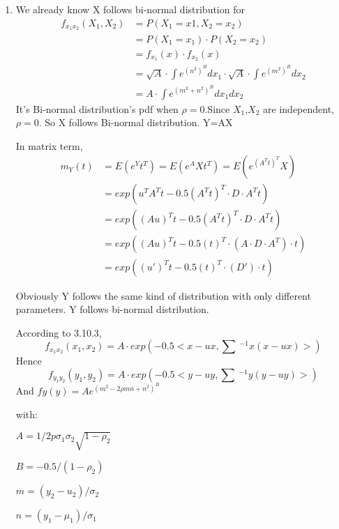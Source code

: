 \documentclass[12pt,a4paper]{article}
\makeatletter
\theoremstyle{definition}
\newtheorem*{solution}{Solution}
\renewenvironment{solution}[1][Solution] {\par\pushQED{\qed}\normalfont\topsep6\p@\@plus6\p@\relax\trivlist\item[\hskip\labelsep\bfseries#1\@addpunct{.}]\ignorespaces}{\popQED\endtrivlist\@endpefalse} \makeatother
\makeatother
\begin{document}
\begin{enumerate}[label=\roman*)]
\begin{solution}
        We already know X follows bi-normal distribution for 
        \begin{equation*}
            \begin{split}
                f_{x_1x_2}(X_1,X_2)&=P(X_1=x1,X_2=x_2)\\
                &=P(X_1=x_1)\cdot P(X_2=x_2)\\
                &=f_{x_1}(x)\cdot f_{x_2}(x)\\
                &=\sqrt{A}\cdot \int e^{(n^2)^B}dx_1\cdot \sqrt{A}\cdot \int e^{(m^2)^B}dx_2\\
                &=A\cdot \int e^{(m^2+n^2)^B} dx_1 dx_2
            \end{split}
        \end{equation*}
        It’s Bi-normal distribution’s pdf when $\rho=0$.Since $X_1$,$X_2$ are independent, $\rho=0$. So X follows Bi-normal distribution. Y=AX
        
        In matrix term,
        \begin{equation*}
            \begin{split}
                m_Y(t)&=E(e^Yt^T)=E(e^AXt^T)=E(e^{(A^Tt)^T}X)\\
                &=exp(u^TA^Tt-0.5(A^Tt)^T\cdot D\cdot A^Tt)\\
                &=exp((Au)^Tt-0.5(A^Tt)^T\cdot D\cdot A^Tt)\\
                &=exp((Au)^Tt-0.5(t)^T\cdot (A\cdot D\cdot A^T)\cdot t)\\
                &=exp((u')^Tt-0.5(t)^T\cdot (D')\cdot t)
            \end{split}
        \end{equation*}
        
        Obviously Y follows the same kind of distribution with only different parameters. Y follows bi-normal distribution.
    
        According to 3.10.3, 
        \begin{equation*}
            f_{x_1x_2}(x_1,x_2)=A\cdot exp(-0.5 < x-ux, \sum \ ^{-1} x(x-ux) > )
        \end{equation*}
        Hence
        \begin{equation*}
            f_{y_1y_2}(y_1,y_2)=A\cdot exp(-0.5<y-uy,\sum \ ^{-1}y(y-uy)>)
        \end{equation*}
        And $fy(y)=Ae^(m^2-2\rho mn+n^2)^B$
        
        with:

        $A=1/2p\sigma_1\sigma_2 \sqrt{1-\rho_2}$

        $B=-0.5/(1-\rho_2)$

        $m=(y_2-u_2)/\sigma_2$

        $n=(y_1-\mu_1)/\sigma_1$
    \end{solution}
\end{enumerate}
\end{document}
